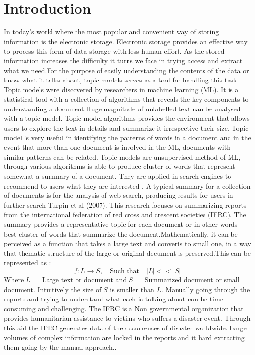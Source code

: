 \chapter{Introduction}
In today's world where the most popular and convenient way of storing information is the electronic storage. Electronic storage provides an effective way to process this form of data storage with less human effort. As the stored information increases the difficulty it turns we face in trying access and extract what we need.For the purpose of easily understanding the contents of the data or know what it talks about, topic models serves as a tool for handling this task.
Topic models were discovered by researchers in  machine learning (ML).  It is a statistical tool with a collection of algorithms that reveals the key components to understanding a document.Huge magnitude of unlabelled text can be analysed with a topic model. Topic model algorithms provides the environment that allows   users to explore the text in details and summarize it irrespective their size. Topic model is very useful in identifying the patterns of words in a document and in the event that more than one document is involved in the ML, documents with similar patterns can be related. 
Topic models are unsupervised method of ML, through various algorithms is able to produce cluster of words that represent somewhat a summary of a document. They are applied in search engines to recommend to users what they are interested . A typical summary for a collection of documents is for the analysis of web search, producing results for users in further search Turpin et al (2007). This research focuses on summarizing reports from the international federation of red cross and crescent societies (IFRC). The summary provides  a  representative topic for each document or in other words best cluster of words that summarize the document.Mathematically, it can be perceived as a function that takes a large text and converts to small one, in a way that thematic structure of the large or original document is preserved.This can be represented as :
$$f:L \longrightarrow S, \quad \text{Such that} \quad |L| << |S|      $$
Where $L=$ Large text or document and $S=$ Summarized document or small document. Intuitively the size of $S$ is smaller than $L$.
Manually going through the reports and trying to understand what each is talking about can be time consuming and challenging. The IFRC is a Non governmental organization that provides humanitarian assistance to victims who suffers a disaster event. Through this aid the 	IFRC generates data of the occurrences of disaster worldwide. Large volumes of complex information    are locked in the reports and it hard extracting them going by the manual approach.. 
